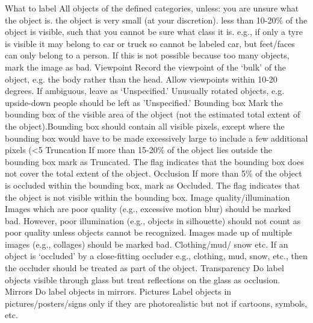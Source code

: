 \begin{outline}
    \1 What to label
       \2 All objects of the defined categories, unless:
        \3 you are unsure what the object is.
        \3 the object is very small (at your discretion).
        \3 less than 10-20\% of the object is visible, such that you cannot be sure what class it is. e.g., if only a tyre is visible it may belong to car or truck so cannot be labeled car, but feet/faces can only belong to a person.
      \2If this is not possible because too many objects, mark the image as bad.
    \1 Viewpoint
       \2 Record the viewpoint of the ‘bulk’ of the object, e.g. the body rather than the head.  Allow viewpoints within 10-20 degrees. If ambiguous, leave as ‘Unspecified.’ Unusually rotated objects, e.g. upside-down people should be left as 'Unspecified.'
    \1 Bounding box
       \2 Mark the bounding box of the visible area of the object (not the estimated total extent of the object).Bounding box should contain all visible pixels, except where the bounding box would have to be made excessively large to include a few additional pixels (<5%
    \1 Truncation
       \2 If more than 15-20\% of the object lies outside the bounding box mark as Truncated. The flag indicates that the bounding box does not cover the total extent of the object.
    \1 Occlusion
       \2If more than 5\% of the object is occluded within the bounding box, mark as Occluded. The flag indicates that the object is not visible within the bounding box.
    \1 Image quality/illumination
       \2 Images which are poor quality (e.g., excessive motion blur) should be marked bad.  However, poor illumination (e.g., objects in silhouette) should not count as poor quality unless objects cannot be recognized. Images made up of multiple images (e.g., collages) should be marked bad.
    \1 Clothing/mud/ snow etc.
       \2 If an object is ‘occluded’ by a close-fitting occluder e.g., clothing, mud, snow, etc., then the occluder should be treated as part of the object.
    \1 Transparency
       \2 Do label objects visible through glass but treat reflections on the glass as occlusion.
    \1 Mirrors
       \2 Do label objects in mirrors.
    \1 Pictures
       \2 Label objects in pictures/posters/signs only if they are photorealistic but not if cartoons, symbols, etc.
\end{outline}

